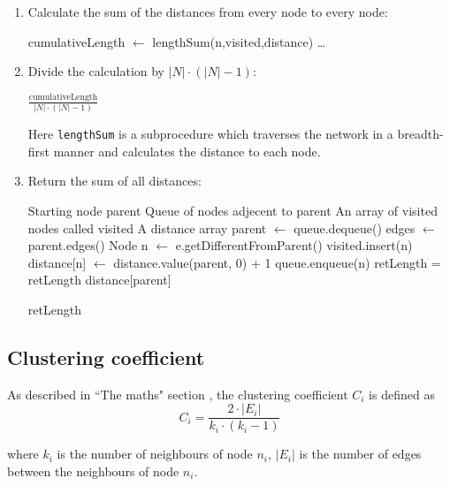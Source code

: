 \documentclass[a4paper,11pt,titlepage]{article}
\newcommand{\code}[1]{\texttt{#1}}
\begin{document}
\begin{enumerate}

\item Calculate the sum of the distances from every node to every
node:

\begin{algorithmic}
    \STATE cumulativeLength $\gets$ lengthSum(n,visited,distance)
    \STATE \dots
  \ENDFOR
\end{algorithmic}

\item Divide the calculation by $|N| \cdot (|N| - 1)$:

\begin{algorithmic}
  \RETURN $\frac{\mathrm{cumulativeLength}}{|N| \cdot (|N| - 1)}$
\end{algorithmic}

Here \code{lengthSum} is a subprocedure which traverses the network in a
breadth-first manner and calculates the distance to each node.

\item Return the sum of all distances:

\begin{algorithmic}
  \REQUIRE Starting node parent
  \REQUIRE Queue of nodes adjecent to parent
  \REQUIRE An array of visited nodes called visited
  \REQUIRE A distance array
    \STATE parent $\gets$ queue.dequeue()
    \STATE edges $\gets$ parent.edges()
    \STATE Node n $\gets$ e.getDifferentFromParent()
        \STATE visited.insert(n)
        \STATE distance[n] $\gets$ distance.value(parent, 0) + 1
        \STATE queue.enqueue(n)
      \ENDIF
    \ENDFOR
    \STATE retLength = retLength distance[parent]
  \ENDWHILE

  \RETURN retLength
\end{algorithmic}

\end{enumerate}

\subsection{Clustering coefficient}
As described in ``The maths" section \label{sec:clusteringcoefficient}, the
clustering coefficient $C_i$ is defined as
\[ C_i = \frac{2 \cdot |E_i|}{k_i \cdot (k_i-1)} \]

where $k_i$ is the number of neighbours of node $n_i$, $|E_i|$ is the number of edges between the neighbours of node $n_i$.
\end{document}
